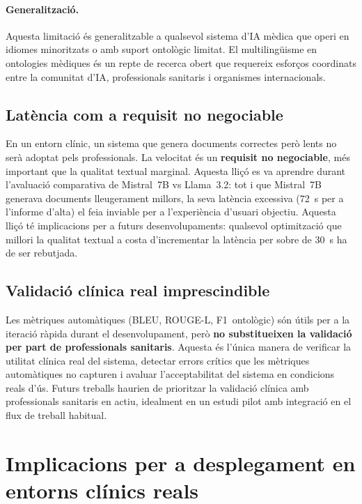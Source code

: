 \documentclass[CAT]{TFUOC}%
\begin{document}
\paragraph{Generalització.}
Aquesta limitació és generalitzable a qualsevol sistema d'IA mèdica que operi en idiomes minoritzats o amb suport ontològic limitat. El multilingüisme en ontologies mèdiques és un repte de recerca obert que requereix esforços coordinats entre la comunitat d'IA, professionals sanitaris i organismes internacionals.

\subsection{Latència com a requisit no negociable}

En un entorn clínic, un sistema que genera documents correctes però lents no serà adoptat pels professionals. La velocitat és un \textbf{requisit no negociable}, més important que la qualitat textual marginal. Aquesta lliçó es va aprendre durant l'avaluació comparativa de Mistral~7B vs Llama~3.2: tot i que Mistral~7B generava documents lleugerament millors, la seva latència excessiva (72~s per a l'informe d'alta) el feia inviable per a l'experiència d'usuari objectiu. Aquesta lliçó té implicacions per a futurs desenvolupaments: qualsevol optimització que millori la qualitat textual a costa d'incrementar la latència per sobre de 30~s ha de ser rebutjada.

\subsection{Validació clínica real imprescindible}

Les mètriques automàtiques (BLEU, ROUGE-L, F1~ontològic) són útils per a la iteració ràpida durant el desenvolupament, però \textbf{no substitueixen la validació per part de professionals sanitaris}. Aquesta és l'única manera de verificar la utilitat clínica real del sistema, detectar errors crítics que les mètriques automàtiques no capturen i avaluar l'acceptabilitat del sistema en condicions reals d'ús. Futurs treballs haurien de prioritzar la validació clínica amb professionals sanitaris en actiu, idealment en un estudi pilot amb integració en el flux de treball habitual.

\section{Implicacions per a desplegament en entorns clínics reals}
\end{document}
